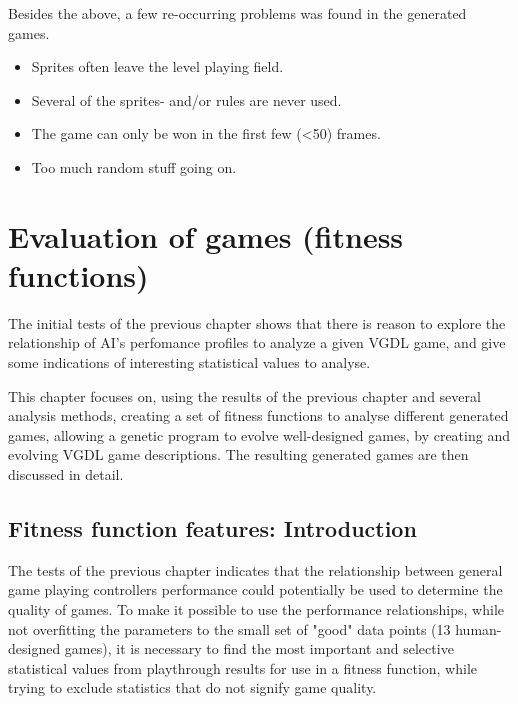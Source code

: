 \documentclass[a4paper,titlepage,final]{report}
\begin{document}
Besides the above, a few re-occurring problems was found in the generated games.

\begin{itemize}
\item Sprites often leave the level playing field.
\item Several of the sprites- and/or rules are never used.
\item The game can only be won in the first few (<50) frames.
\item Too much random stuff going on.
\end{itemize}





\chapter{Evaluation of games (fitness functions)}
\label{ch_task2}

The initial tests of the previous chapter shows that there is reason to explore the relationship of AI's perfomance profiles to analyze a given VGDL game, and give some indications of interesting statistical values to analyse.

This chapter focuses on, using the results of the previous chapter and several analysis methods, creating a set of fitness functions to analyse different generated games, allowing a genetic program to evolve well-designed games, by creating and evolving VGDL game descriptions.
The resulting generated games are then discussed in detail.

\section{Fitness function features: Introduction}
\label{sec_task2intro}
The tests of the previous chapter indicates that the relationship between general game playing controllers performance could potentially be used to determine the quality of games. 
To make it possible to use the performance relationships, while not overfitting the parameters to the small set of "good" data points (13 human-designed games), it is necessary to find the most important and selective statistical values from playthrough results for use in a fitness function, while trying to exclude statistics that do not signify game quality.
\end{document}
